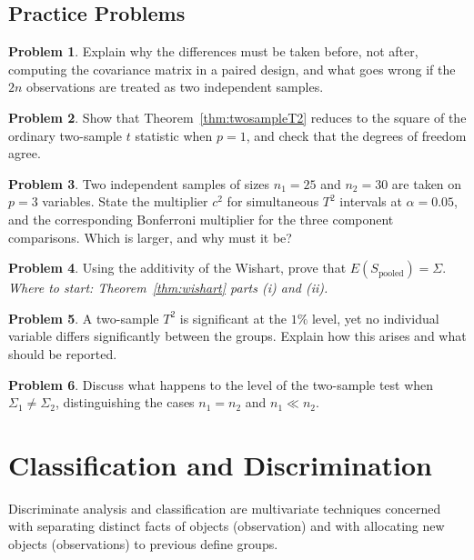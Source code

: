 \documentclass[11pt,a4paper]{article}
\theoremstyle{definition}
\newtheorem{problemx}{Problem}[section]
\newenvironment{problem}{\begin{problemx}}{\end{problemx}}
\begin{document}
\subsection{Practice Problems}

\begin{problem}
Explain why the differences must be taken before, not after, computing the
covariance matrix in a paired design, and what goes wrong if the $2n$
observations are treated as two independent samples.
\end{problem}

\begin{problem}
Show that Theorem~\ref{thm:twosampleT2} reduces to the square of the ordinary
two-sample $t$ statistic when $p=1$, and check that the degrees of freedom
agree.
\end{problem}

\begin{problem}
Two independent samples of sizes $n_1=25$ and $n_2=30$ are taken on $p=3$
variables. State the multiplier $c^{2}$ for simultaneous $T^{2}$ intervals at
$\alpha=0.05$, and the corresponding Bonferroni multiplier for the three
component comparisons. Which is larger, and why must it be?
\end{problem}

\begin{problem}
Using the additivity of the Wishart, prove that
$E\left(S_{\text{pooled}}\right) = \Sigma$.
\emph{Where to start: Theorem~\ref{thm:wishart} parts (i) and (ii).}
\end{problem}

\begin{problem}
A two-sample $T^{2}$ is significant at the $1\%$ level, yet no individual
variable differs significantly between the groups. Explain how this arises and
what should be reported.
\end{problem}

\begin{problem}
Discuss what happens to the level of the two-sample test when
$\Sigma_1\neq\Sigma_2$, distinguishing the cases $n_1=n_2$ and $n_1\ll n_2$.
\end{problem}


\section{Classification and Discrimination}

Discriminate analysis and classification are multivariate techniques concerned with separating distinct facts of objects (observation) and with allocating new objects (observations) to previous define groups.\\
\end{document}
